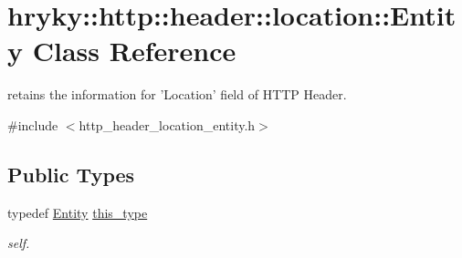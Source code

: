 \hypertarget{classhryky_1_1http_1_1header_1_1location_1_1_entity}{\section{hryky\-:\-:http\-:\-:header\-:\-:location\-:\-:Entity Class Reference}
\label{classhryky_1_1http_1_1header_1_1location_1_1_entity}
}


retains the information for 'Location' field of H\-T\-T\-P Header.  




{\ttfamily \#include $<$http\-\_\-header\-\_\-location\-\_\-entity.\-h$>$}

\subsection*{Public Types}
\begin{DoxyCompactItemize}
\item 
\hypertarget{classhryky_1_1http_1_1header_1_1location_1_1_entity_a49f0f7642755afebfca2a040ba041853}{typedef \hyperlink{classhryky_1_1http_1_1header_1_1location_1_1_entity}{Entity} \hyperlink{classhryky_1_1http_1_1header_1_1location_1_1_entity_a49f0f7642755afebfca2a040ba041853}{this\-\_\-type}}\label{classhryky_1_1http_1_1header_1_1location_1_1_entity_a49f0f7642755afebfca2a040ba041853}

\begin{DoxyCompactList}\small\item\em self. \end{DoxyCompactList}\end{DoxyCompactItemize}
